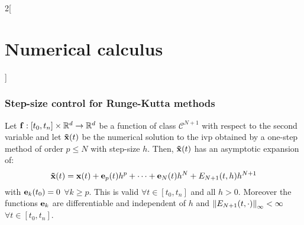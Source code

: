 \documentclass[../../../main_math.tex]{subfiles}
\begin{document}
\begin{multicols}{2}[\section{Numerical calculus}]
  \subsubsection{Step-size control for Runge-Kutta methods}
  \begin{theorem}\label{NC:errorControl}
    Let $\boldsymbol{\mathrm{f}}:[t_0,t_n]\times\mathbb{R}^d\rightarrow\mathbb{R}^d$ be a function of class $\mathcal{C}^{N+1}$ with respect to the second variable and let $\boldsymbol{\mathrm{\tilde{x}}}(t)$ be the numerical solution to the ivp  obtained by a one-step method of order $p\leq N$ with step-size $h$. Then, $\boldsymbol{\mathrm{\tilde{x}}}(t)$ has an asymptotic expansion of:
    $$\boldsymbol{\mathrm{\tilde{x}}}(t)=\boldsymbol{\mathrm{x}}(t)+\boldsymbol{\mathrm{e}}_p(t)h^p+\cdots+\boldsymbol{\mathrm{e}}_N(t)h^N+E_{N+1}(t,h)h^{N+1}$$
    with $\boldsymbol{\mathrm{e}}_k(t_0)=0$ $\forall k\geq p$. This is valid $\forall t\in[t_0,t_n]$ and all $h>0$. Moreover the functions $\boldsymbol{\mathrm{e}}_k$ are differentiable and independent of $h$ and $\left\|E_{N+1}(t,\cdot)\right\|_\infty<\infty$ $\forall t\in[t_0,t_n]$.
  \end{theorem}

\end{multicols}
\end{document}

